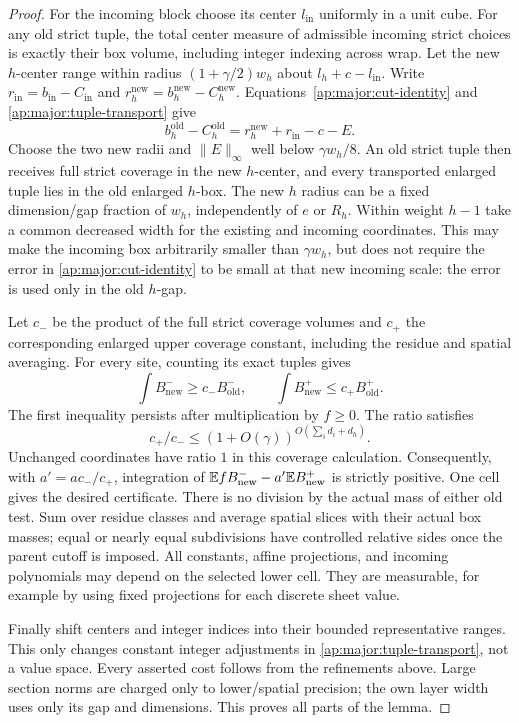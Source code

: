 \begin{proof}
For the incoming block choose its center $l_{\mathrm{in}}$ uniformly
in a unit cube.  For any old strict tuple, the total center measure
of admissible incoming strict choices is exactly their box volume,
including integer indexing across wrap.  Let the new $h$-center
range within radius $(1+\gamma/2)w_h$ about
$l_h+c-l_{\mathrm{in}}$.  Write
$r_{\mathrm{in}}=b_{\mathrm{in}}-C_{\mathrm{in}}$ and
$r_h^{\mathrm{new}}=b_h^{\mathrm{new}}-C_h^{\mathrm{new}}$.
Equations~\eqref{ap:major:cut-identity} and
\eqref{ap:major:tuple-transport} give
\[
       b_h^{\mathrm{old}}-C_h^{\mathrm{old}}
             =r_h^{\mathrm{new}}+r_{\mathrm{in}}-c-E.
\]
Choose the two new radii and $\|E\|_\infty$ well below
$\gamma w_h/8$.  An old strict tuple then receives full strict
coverage in the new $h$-center, and every transported enlarged tuple
lies in the old enlarged $h$-box.  The new $h$ radius can be a fixed
dimension/gap fraction of $w_h$, independently of $e$ or $R_h$.
Within weight $h-1$ take a common decreased width for the existing
and incoming coordinates.  This may make the incoming box
arbitrarily smaller than $\gamma w_h$, but does not require the
error in \eqref{ap:major:cut-identity} to be small at that new
incoming scale: the error is used only in the old $h$-gap.

Let $c_-$ be the product of the full strict coverage volumes and
$c_+$ the corresponding enlarged upper coverage constant, including
the residue and spatial averaging.  For every site, counting its
exact tuples gives
\[
 \int B^-_{\mathrm{new}}\ge c_- B^-_{\mathrm{old}},
       \qquad
 \int B^+_{\mathrm{new}}\le c_+ B^+_{\mathrm{old}}.
\]
The first inequality persists after multiplication by $f\ge0$.
The ratio satisfies
\[
                  c_+/c_-\le
                (1+O(\gamma))^{O(\sum_i d_i+d_h)}.
\]
Unchanged coordinates have ratio $1$ in this coverage calculation.
Consequently, with $a'=a c_-/c_+$, integration of
$\mathbb E fB^-_{\mathrm{new}}-a'\mathbb E B^+_{\mathrm{new}}$ is strictly
positive.  One cell gives the desired certificate.  There is no
division by the actual mass of either old test.  Sum over residue
classes and average spatial slices with their actual box masses;
equal or nearly equal subdivisions have controlled relative sides
once the parent cutoff is imposed.  All constants, affine
projections, and incoming polynomials may depend on the selected
lower cell.  They are measurable, for example by using fixed
projections for each discrete sheet value.

Finally shift centers and integer indices into their bounded
representative ranges.  This only changes constant integer
adjustments in \eqref{ap:major:tuple-transport}, not a value space.
Every asserted cost follows from the refinements above.  Large
section norms are charged only to lower/spatial precision; the own
layer width uses only its gap and dimensions.  This proves all
parts of the lemma.
\end{proof}

